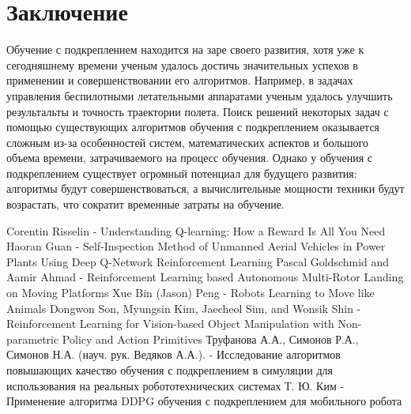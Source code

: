 \documentclass[12 pt, a4paper]{article}
\theoremstyle{definition}
\theoremstyle{plain}
\theoremstyle{remark}
\begin{document}
\section{Заключение}
Обучение с подкреплением находится на заре своего развития, хотя уже к сегодняшнему времени ученым удалось достичь значительных успехов в применении и совершенствовании его алгоритмов. Например, в задачах управления беспилотными летательными аппаратами ученым удалось улучшить результальты и точность траектории полета. Поиск решений некоторых задач с помощью существующих алгоритмов обучения с подкреплением оказывается сложным из-за особенностей систем, математических аспектов и большого объема времени, затрачиваемого на процесс обучения. Однако у обучения с подкреплением существует огромный потенциал для будущего развития: алгоритмы будут совершенствоваться, а вычислительные мощности техники будут возрастать, что сократит временные затраты на обучение.

\newpage
{}
\begin{thebibliography}{}
      Corentin Risselin  -  Understanding Q-learning: How a Reward Is All You Need
       Haoran Guan  -  Self-Inspection Method of Unmanned Aerial Vehicles in Power Plants Using Deep Q-Network Reinforcement Learning
      Pascal Goldschmid and Aamir Ahmad  -  Reinforcement Learning based Autonomous Multi-Rotor Landing on Moving Platforms
      Xue Bin (Jason) Peng  -  Robots Learning to Move like Animals
      Dongwon Son, Myungsin Kim, Jaecheol Sim, and Wonsik Shin  -  Reinforcement Learning for Vision-based Object Manipulation with Non-parametric Policy and Action Primitives 
      Труфанова А.А., Симонов Р.А., Симонов Н.А. (науч. рук. Ведяков А.А.).   -  Исследование алгоритмов повышающих качество обучения с подкреплением в симуляции для использования на реальных робототехнических системах
      Т. Ю. Ким  -  Применение алгоритма DDPG обучения с подкреплением для мобильного робота
 
\end{thebibliography}
 
\end{document}
